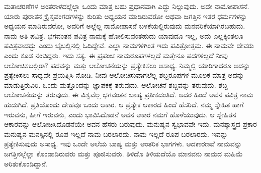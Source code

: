 ಮತಾಚರಣೆಗಳ ಅಂತರಾಳದಲ್ಲೆಲ್ಲಾ ಒಂದು ಮಾತ್ರ ಬಹು ಪ್ರಧಾನವಾಗಿ ಎದ್ದು ನಿಲ್ಲುವುದು. ಅದೇ ನಾಮೋಪಾಸನೆ. ಯಾರು ಪುರಾತನ ಕ್ರೈಸ್ತಪಂಗಡಗಳನ್ನು ಕುರಿತು ಅಧ್ಯಯನ ಮಾಡಿರುವರೋ ಅಥವಾ ಜಗತ್ತಿನ ಇತರ ಧರ್ಮಗಳನ್ನು ಅಧ್ಯಯನ ಮಾಡಿರುವರೋ, ಅವರಿಗೆ ಅಲ್ಲೆಲ್ಲ ನಾಮೋಪಾಸನೆ ಬಳಕೆಯಲ್ಲಿರುವುದು ಮನವರಿಕೆಯಾಗಿರಬಹುದು. ನಾಮ ಅತಿ ಪವಿತ್ರ. ಭಗವಂತನ ಪವಿತ್ರ ನಾಮಕ್ಕೆ ಹೋಲಿಸುವಂತಹುದು ಯಾವುದೂ ಇಲ್ಲ, ಅದು ಎಲ್ಲಕ್ಕಿಂತಲೂ ಪವಿತ್ರವಾದದ್ದು ಎಂದು ಬೈಬಲ್ಲಿನಲ್ಲಿ ಓದಿದ್ದೇವೆ. ಎಲ್ಲಾ ನಾಮಗಳಿಗಿಂತ ಇದು ಪವಿತ್ರೋತ್ತಮ. ಈ ನಾಮವೇ ದೇವರು ಎಂದು ಕೂಡ ನಂಬಿದ್ದರು. ಇದು ಸತ್ಯ. ಈ ಪ್ರಪಂಚ ನಾಮರೂಪಗಳಲ್ಲದೆ ಮತ್ತೇನೂ ಪದಗಳಿಲ್ಲದೆ ನೀವು ಆಲೋಚಿಸಬಲ್ಲಿರಾ? ಪದವನ್ನು ಮತ್ತು ಆಲೋಚನೆಯನ್ನು ಪ್ರತ್ಯೇಕಿಸಲು ಅಸಾಧ್ಯ. ನಿಮ್ಮಲ್ಲಿ ಯಾರಿಗಾದರೂ ಅದನ್ನು ಪ್ರತ್ಯೇಕಿಸಲು ಸಾಧ್ಯವೇ ಪ್ರಯತ್ನಿಸಿ ನೋಡಿ. ನೀವು ಆಲೋಚಿಸುವಾಗಲೆಲ್ಲ ಶಬ್ದರೂಪಗಳ ಮೂಲಕ ಮಾತ್ರ ಅದನ್ನು ಮಾಡುತ್ತಿರುವಿರಿ. ಒಂದು ಮತ್ತೊಂದನ್ನು ಜ್ಞಾಪಕಕ್ಕೆ ತರುವುದು. ಆಲೋಚನೆ ಶಬ್ದವನ್ನು ತರುವುದು. ಶಬ್ದ ಆಲೋಚನೆಯನ್ನು ತರುವುದು. ಈ ವಿಶ್ವವೆಲ್ಲ ಭಗವಂತನ ಬಾಹ್ಯ ಪ್ರತೀಕದಂತಿದೆ. ಅದರ ಹಿಂದೆ ಅವನ ಪವಿತ್ರ ನಾಮ ಹುದುಗಿದೆ. ಪ್ರತಿಯೊಂದು ದೇಹವೂ ಒಂದು ಆಕಾರ. ಆ ಪ್ರತ್ಯೇಕ ಆಕಾರದ ಹಿಂದೆ ಹೆಸರಿದೆ. ನಮ್ಮ ಸ್ನೇಹಿತ ಹಾಗೆ ಇರುವನು, ಹೀಗೆ ಇರುವನು, ಎಂದು ಭಾವಿಸಿದೊಡನೆ ಅವನ ಆಕಾರ ನಮಗೆ ಹೊಳೆಯುವುದು. ಆ ಸ್ನೇಹಿತನ ಆಕಾರವನ್ನು ಆಲೋಚಿಸಿದೊಡನೆಯೇ ಅವನ ಹೆಸರು ಬರುವುದು. ಮನುಷ್ಯನ ಸ್ವಭಾವವೇ ಇದು. ಮನಶ್ಶಾಸ್ತ್ರದ ಪ್ರಕಾರ ಮನುಷ್ಯನ ಮನಸ್ಸಿನಲ್ಲಿ ರೂಪ ಇಲ್ಲದೆ ನಾಮ ಬರಲಾರದು. ನಾಮ ಇಲ್ಲದೆ ರೂಪ ಬರಲಾರದು. ಇವನ್ನು ಪ್ರತ್ಯೇಕಿಸುವುದು ಅಸಾಧ್ಯ. ಇವು ಒಂದೇ ಅಲೆಯ ಬಾಹ್ಯ ಮತ್ತು ಆಂತರಿಕ ಭಾಗಗಳು. ಆದಕಾರಣವೆ ನಾಮವನ್ನು ಜಗತ್ತಿನಲ್ಲೆಲ್ಲಾ ಕೊಂಡಾಡಿರುವರು ಮತ್ತು ಪೂಜಿಸುವರು. ತಿಳಿದೊ ತಿಳಿಯದೆಯೊ ಮಾನವನು ನಾಮದ ಮಹಿಮೆ ಅರಿತುಕೊಂಡಿದ್ದಾನೆ.

